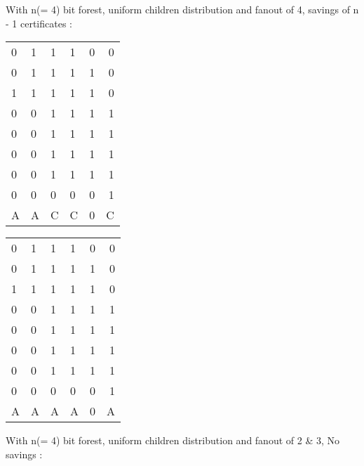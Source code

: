 With n(= 4) bit forest, uniform children distribution and fanout of 4, savings of n - 1 certificates :

\begin{multicols}{2}

	\begin{tabular}{ l l |l l c r }
	  
	  0 & 1 & 1 & 1 & 0 & 0 \\
	  0 & 1 & 1 & 1 & 1 & 0 \\
	  1 & 1 & 1 & 1 & 1 & 0 \\
	  \hline
	  0 & 0 & 1 & 1 & 1 & 1 \\
	  0 & 0 & 1 & 1 & 1 & 1 \\
	  0 & 0 & 1 & 1 & 1 & 1 \\
	  0 & 0 & 1 & 1 & 1 & 1 \\
	  0 & 0 & 0 & 0 & 0 & 1 \\
	  \hline	
	  A & A & C & C & 0 & C \\
	
	\end{tabular}
\columnbreak{|}
	\begin{tabular}{ l l | l l c r }
	  0 & 1 & 1 & 1 & 0 & 0 \\
	  0 & 1 & 1 & 1 & 1 & 0 \\
	  1 & 1 & 1 & 1 & 1 & 0 \\
	  \hline
	  0 & 0 & 1 & 1 & 1 & 1 \\
	  0 & 0 & 1 & 1 & 1 & 1 \\
	  0 & 0 & 1 & 1 & 1 & 1 \\
	  0 & 0 & 1 & 1 & 1 & 1 \\
	  0 & 0 & 0 & 0 & 0 & 1 \\
	  \hline
	  A & A & A & A & 0 & A\\

	\end{tabular}

\end{multicols}

With n(= 4) bit forest, uniform children distribution and fanout of 2 \& 3, No savings :

